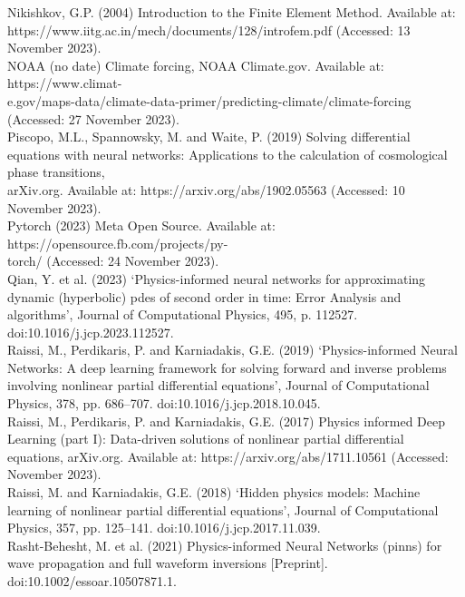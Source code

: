 \documentclass[12pt, openany]{book}
\begin{document}
Nikishkov, G.P. (2004) Introduction to the Finite Element Method. Available at: \\ https://www.iitg.ac.in/mech/documents/128/introfem.pdf (Accessed: 13 November 2023). \\

NOAA (no date) Climate forcing, NOAA Climate.gov. Available at: https://www.climat- \\ e.gov/maps-data/climate-data-primer/predicting-climate/climate-forcing (Accessed: 27 November 2023). \\

Piscopo, M.L., Spannowsky, M. and Waite, P. (2019) Solving differential equations with neural networks: Applications to the calculation of cosmological phase transitions, \\ arXiv.org. Available at: https://arxiv.org/abs/1902.05563 (Accessed: 10 November 2023). \\

Pytorch (2023) Meta Open Source. Available at: https://opensource.fb.com/projects/py- \\ torch/ (Accessed: 24 November 2023). \\

Qian, Y. et al. (2023) ‘Physics-informed neural networks for approximating dynamic (hyperbolic) pdes of second order in time: Error Analysis and algorithms’, Journal of Computational Physics, 495, p. 112527. doi:10.1016/j.jcp.2023.112527. \\

Raissi, M., Perdikaris, P. and Karniadakis, G.E. (2019) ‘Physics-informed Neural Networks: A deep learning framework for solving forward and inverse problems involving nonlinear partial differential equations’, Journal of Computational Physics, 378, pp. 686–707. doi:10.1016/j.jcp.2018.10.045. \\

Raissi, M., Perdikaris, P. and Karniadakis, G.E. (2017) Physics informed Deep Learning (part I): Data-driven solutions of nonlinear partial differential equations, arXiv.org. Available at: https://arxiv.org/abs/1711.10561 (Accessed: November 2023). \\

Raissi, M. and Karniadakis, G.E. (2018) ‘Hidden physics models: Machine learning of nonlinear partial differential equations’, Journal of Computational Physics, 357, pp. 125–141. doi:10.1016/j.jcp.2017.11.039. \\

Rasht-Behesht, M. et al. (2021) Physics-informed Neural Networks (pinns) for wave propagation and full waveform inversions [Preprint]. doi:10.1002/essoar.10507871.1. \\
\end{document}
